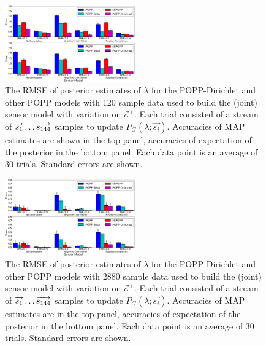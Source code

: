 \begin{figure}[t!]
	\centering
	\includegraphics[width=0.5\textwidth]{./figures/tjpr_comparison_120.png}
    \caption{The RMSE of posterior estimates of $\lambda$ for the POPP-Dirichlet and other POPP models with 120 sample data used to build the (joint) sensor model with variation on $\mathcal{E^+}$. Each trial consisted of a stream of $\protect\overrightarrow{s_1} \ldots \protect\overrightarrow{s_{144}}$ samples to update $P_G(\lambda ; \overrightarrow{s_i})$. Accuracies of MAP estimates are shown in the top panel, accuracies of expectation of the posterior in the bottom panel. Each data point is an average of 30 trials. Standard errors are shown.} 
	\label{fig:tjpr_comparison_120}
\end{figure}

\begin{figure}[t!]
	\centering
	\includegraphics[width=0.5\textwidth]{./figures/tjpr_comparison_2880.png}
    \caption{The RMSE of posterior estimates of $\lambda$ for the POPP-Dirichlet and other POPP models with 2880 sample data used to build the (joint) sensor model with variation on $\mathcal{E^+}$. Each trial consisted of a stream of $\protect\overrightarrow{s_1} \ldots \protect\overrightarrow{s_{144}}$ samples to update $P_G(\lambda ; \overrightarrow{s_i})$. Accuracies of MAP estimates are in the top panel, accuracies of expectation of the posterior in the bottom panel. Each data point is an average of 30 trials. Standard errors are shown.} 
	\label{fig:tjpr_comparison_2880}
\end{figure}

